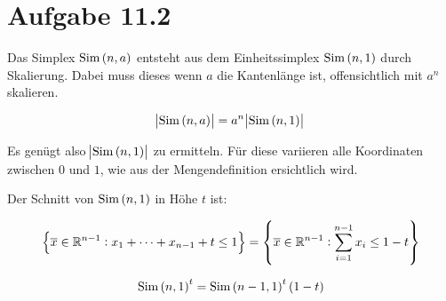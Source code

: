 \documentclass[a4paper,german,12pt,smallheadings]{scrartcl}
\begin{document}
\section*{Aufgabe 11.2}

Das Simplex $\operatorname{Sim}\del{n, a}$ entsteht aus dem Einheitssimplex
$\operatorname{Sim}\del{n,1}$ durch Skalierung. Dabei muss dieses wenn $a$ die
Kantenlänge ist, offensichtlich mit $a^n$ skalieren.

\begin{equation*}
  \envert{\operatorname{Sim}\del{n, a}} = a^n \envert{\operatorname{Sim}\del{n, 1}}
\end{equation*}

Es genügt also $\envert{\operatorname{Sim}\del{n, 1}}$ zu ermitteln. Für diese variieren alle Koordinaten zwischen $0$ und $1$, wie aus der Mengendefinition ersichtlich wird.

Der Schnitt von $\operatorname{Sim}\del{n,1}$ in Höhe $t$ ist:

\begin{equation*}
  \cbr{\overline{x} \in \mathbb{R}^{n-1}: x_1 + \dots + x_{n-1} + t \le 1} =
  \cbr{\overline{x} \in \mathbb{R}^{n-1}: \sum_{i=1}^{n-1} x_i\le 1 - t}
\end{equation*}

\begin{equation*}
  \operatorname{Sim}\del{n,1}^t = \operatorname{Sim}\del{n-1, 1}^t (1-t)
\end{equation*}
\end{document}
